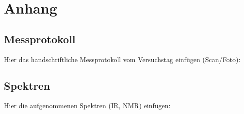 \section{Anhang}
\label{cap:Anhang}

\subsection{Messprotokoll}
Hier das handschriftliche Messprotokoll vom Versuchstag einfügen (Scan/Foto):
%

\subsection{Spektren}
Hier die aufgenommenen Spektren (IR, NMR) einfügen:
